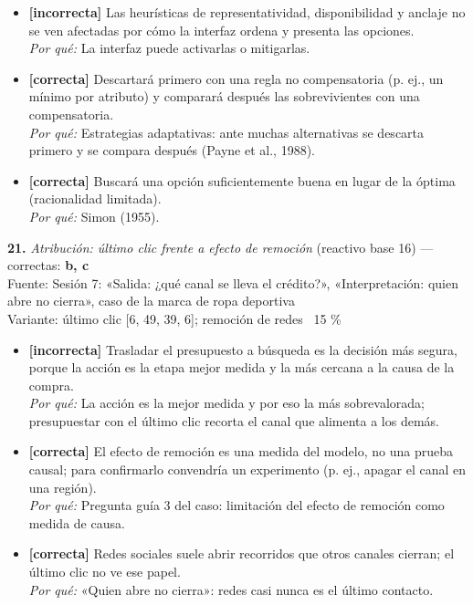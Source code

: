 \documentclass[10pt,letterpaper]{article}
\begin{document}
{\begin{itemize}[leftmargin=1.2em,itemsep=0pt,topsep=1pt,parsep=0pt]
\item[\textbf{b)}] {\footnotesize \textbf{[incorrecta]} Las heurísticas de representatividad, disponibilidad y anclaje no se ven afectadas por cómo la interfaz ordena y presenta las opciones.\\ \textit{Por qué:} La interfaz puede activarlas o mitigarlas.}
\item[\textbf{c)}] {\footnotesize \textbf{[correcta]} Descartará primero con una regla no compensatoria (p. ej., un mínimo por atributo) y comparará después las sobrevivientes con una compensatoria.\\ \textit{Por qué:} Estrategias adaptativas: ante muchas alternativas se descarta primero y se compara después (Payne et al., 1988).}
\item[\textbf{d)}] {\footnotesize \textbf{[correcta]} Buscará una opción suficientemente buena en lugar de la óptima (racionalidad limitada).\\ \textit{Por qué:} Simon (1955).}
\end{itemize}
\vspace{3pt}\noindent\textbf{21.} \textit{Atribución: último clic frente a efecto de remoción} (reactivo base 16) — correctas: \textbf{b, c}\\[-1pt]
{\scriptsize Fuente: Sesión 7: «Salida: ¿qué canal se lleva el crédito?», «Interpretación: quien abre no cierra», caso de la marca de ropa deportiva}
\\{\scriptsize Variante: último clic [6, 49, 39, 6]; remoción de redes ~15 \%}
\begin{itemize}[leftmargin=1.2em,itemsep=0pt,topsep=1pt,parsep=0pt]
\item[\textbf{a)}] {\footnotesize \textbf{[incorrecta]} Trasladar el presupuesto a búsqueda es la decisión más segura, porque la acción es la etapa mejor medida y la más cercana a la causa de la compra.\\ \textit{Por qué:} La acción es la mejor medida y por eso la más sobrevalorada; presupuestar con el último clic recorta el canal que alimenta a los demás.}
\item[\textbf{b)}] {\footnotesize \textbf{[correcta]} El efecto de remoción es una medida del modelo, no una prueba causal; para confirmarlo convendría un experimento (p. ej., apagar el canal en una región).\\ \textit{Por qué:} Pregunta guía 3 del caso: limitación del efecto de remoción como medida de causa.}
\item[\textbf{c)}] {\footnotesize \textbf{[correcta]} Redes sociales suele abrir recorridos que otros canales cierran; el último clic no ve ese papel.\\ \textit{Por qué:} «Quien abre no cierra»: redes casi nunca es el último contacto.}

\end{itemize}}
\end{document}
